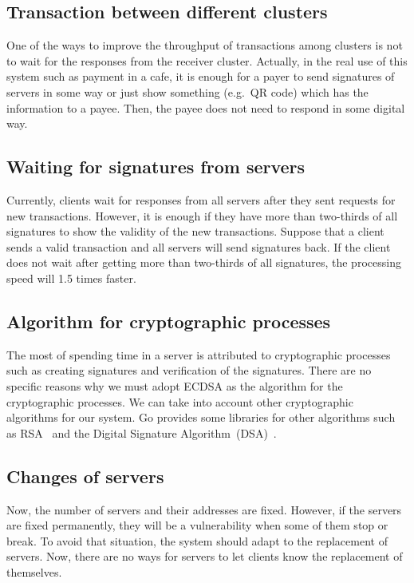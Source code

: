 \documentclass[a4paper, oneside]{discothesis}
\begin{document}
\subsection{Transaction between different clusters}
One of the ways to improve the throughput of transactions among clusters is not to wait
for the responses from the receiver cluster.
Actually, in the real use of this system such as payment in a cafe,
it is enough for a payer to send signatures of servers in some way
or just show something (e.g.\ QR code) which has the information to a payee.
Then, the payee does not need to respond in some digital way.


\subsection{Waiting for signatures from servers}
Currently, clients wait for responses from all servers
after they sent requests for new transactions.
However, it is enough if they have more than two-thirds of all signatures
to show the validity of the new transactions.
Suppose that a client sends a valid transaction and all servers will send signatures back.
If the client does not wait after getting more than two-thirds of all signatures,
the processing speed will 1.5 times faster.


\subsection{Algorithm for cryptographic processes}
The most of spending time in a server is attributed to cryptographic processes
such as creating signatures and verification of the signatures.
There are no specific reasons why we must adopt ECDSA as the algorithm
for the cryptographic processes.
We can take into account other cryptographic algorithms for our system.
Go provides some libraries for other algorithms
such as RSA~\cite{rsa} and the Digital Signature Algorithm~(DSA)~\cite{dsa}.


\subsection{Changes of servers}
Now, the number of servers and their addresses are fixed.
However, if the servers are fixed permanently, they will be a vulnerability
when some of them stop or break.
To avoid that situation, the system should adapt to the replacement of servers.
Now, there are no ways for servers to let clients know the replacement of themselves.
\end{document}
